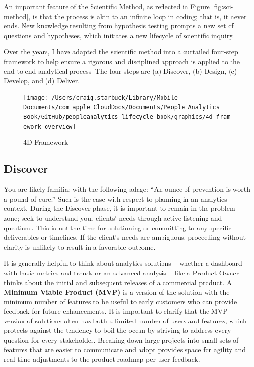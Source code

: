 \documentclass[
]{book}
\begin{document}
An important feature of the Scientific Method, as reflected in Figure \ref{fig:sci-method}, is that the process is akin to an infinite loop in coding; that is, it never ends. New knowledge resulting from hypothesis testing prompts a new set of questions and hypotheses, which initiates a new lifecycle of scientific inquiry.

Over the years, I have adapted the scientific method into a curtailed four-step framework to help ensure a rigorous and disciplined approach is applied to the end-to-end analytical process. The four steps are (a) Discover, (b) Design, (c) Develop, and (d) Deliver.

\begin{figure}

{\centering \texttt{[image: /Users/craig.starbuck/Library/Mobile Documents/com~apple~CloudDocs/Documents/People Analytics Book/GitHub/peopleanalytics\_lifecycle\_book/graphics/4d\_framework\_overview]} 

}

\caption{4D Framework}\label{fig:4d-framework}
\end{figure}

\hypertarget{discover}{%
\subsection{Discover}\label{discover}}

You are likely familiar with the following adage: ``An ounce of prevention is worth a pound of cure.'' Such is the case with respect to planning in an analytics context. During the Discover phase, it is important to remain in the problem zone; seek to understand your clients' needs through active listening and questions. This is not the time for solutioning or committing to any specific deliverables or timelines. If the client's needs are ambiguous, proceeding without clarity is unlikely to result in a favorable outcome.

It is generally helpful to think about analytics solutions -- whether a dashboard with basic metrics and trends or an advanced analysis -- like a Product Owner thinks about the initial and subsequent releases of a commercial product. A \textbf{Minimum Viable Product (MVP)} is a version of the solution with the minimum number of features to be useful to early customers who can provide feedback for future enhancements. It is important to clarify that the MVP version of solutions often has both a limited number of users and features, which protects against the tendency to boil the ocean by striving to address every question for every stakeholder. Breaking down large projects into small sets of features that are easier to communicate and adopt provides space for agility and real-time adjustments to the product roadmap per user feedback.
\end{document}
